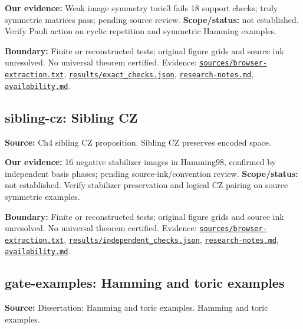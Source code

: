 \documentclass[11pt]{article}
\begin{document}
\textbf{Our evidence:} Weak image symmetry toric3 fails 18 support checks; truly symmetric matrices pass; pending source review. \textbf{Scope/status:} not established. Verify Pauli action on cyclic repetition and symmetric Hamming examples.

\textbf{Boundary:} Finite or reconstructed tests; original figure grids and source ink unresolved. No universal theorem certified. Evidence: \href{https://github.com/alectionary/vibe-math/blob/master/formalization/quintavalle-hgp/sources/browser-extraction.txt}{\nolinkurl{sources/browser-extraction.txt}}, \href{https://github.com/alectionary/vibe-math/blob/master/formalization/quintavalle-hgp/results/exact_checks.json}{\nolinkurl{results/exact_checks.json}}, \href{https://github.com/alectionary/vibe-math/blob/master/formalization/quintavalle-hgp/research-notes.md}{\nolinkurl{research-notes.md}}, \href{https://github.com/alectionary/vibe-math/blob/master/formalization/quintavalle-hgp/availability.md}{\nolinkurl{availability.md}}.
\subsection{sibling-cz: Sibling CZ}
\label{claim:sibling-cz}
\textbf{Source:} Ch4 sibling CZ proposition. Sibling CZ preserves encoded space.

\textbf{Our evidence:} 16 negative stabilizer images in Hamming98, confirmed by independent basis phases; pending source-ink/convention review. \textbf{Scope/status:} not established. Verify stabilizer preservation and logical CZ pairing on source symmetric examples.

\textbf{Boundary:} Finite or reconstructed tests; original figure grids and source ink unresolved. No universal theorem certified. Evidence: \href{https://github.com/alectionary/vibe-math/blob/master/formalization/quintavalle-hgp/sources/browser-extraction.txt}{\nolinkurl{sources/browser-extraction.txt}}, \href{https://github.com/alectionary/vibe-math/blob/master/formalization/quintavalle-hgp/results/independent_checks.json}{\nolinkurl{results/independent_checks.json}}, \href{https://github.com/alectionary/vibe-math/blob/master/formalization/quintavalle-hgp/research-notes.md}{\nolinkurl{research-notes.md}}, \href{https://github.com/alectionary/vibe-math/blob/master/formalization/quintavalle-hgp/availability.md}{\nolinkurl{availability.md}}.
\subsection{gate-examples: Hamming and toric examples}
\label{claim:gate-examples}
\textbf{Source:} Dissertation: Hamming and toric examples. Hamming and toric examples.
\end{document}
